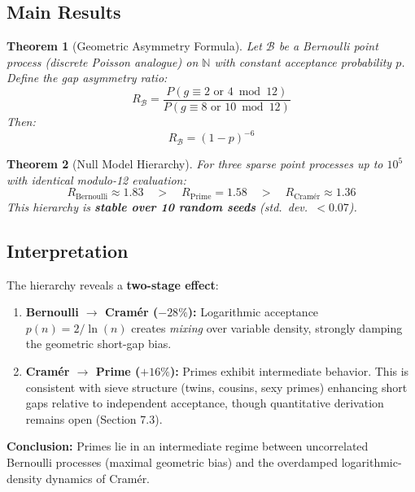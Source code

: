 \documentclass[11pt,a4paper]{article}
\newtheorem{theorem}{Theorem}
\theoremstyle{definition}
\theoremstyle{remark}
\begin{document}
\subsection{Main Results}

\begin{theorem}[Geometric Asymmetry Formula]
Let $\mathcal{B}$ be a Bernoulli point process (discrete Poisson analogue) on $\mathbb{N}$ with constant acceptance probability $p$. Define the gap asymmetry ratio:
\begin{equation}
R_{\mathcal{B}} = \frac{P(g \equiv 2 \text{ or } 4 \bmod 12)}{P(g \equiv 8 \text{ or } 10 \bmod 12)}
\end{equation}
Then:
\begin{equation}\label{eq:main_formula}
\boxed{R_{\mathcal{B}} = (1-p)^{-6}}
\end{equation}
\end{theorem}

\begin{theorem}[Null Model Hierarchy]
For three sparse point processes up to $10^5$ with identical modulo-12 evaluation:
\begin{equation}
R_{\text{Bernoulli}} \approx 1.83 \quad > \quad R_{\text{Prime}} = 1.58 \quad > \quad R_{\text{Cramér}} \approx 1.36
\end{equation}
This hierarchy is \textbf{stable over 10 random seeds} (std.~dev.~$< 0.07$).
\end{theorem}

\subsection{Interpretation}

The hierarchy reveals a \textbf{two-stage effect}:

\begin{enumerate}
\item \textbf{Bernoulli $\to$ Cramér ($-28\%$):} Logarithmic acceptance $p(n) = 2/\ln(n)$ creates \emph{mixing} over variable density, strongly damping the geometric short-gap bias.

\item \textbf{Cramér $\to$ Prime ($+16\%$):} Primes exhibit intermediate behavior. This is consistent with sieve structure (twins, cousins, sexy primes) enhancing short gaps relative to independent acceptance, though quantitative derivation remains open (Section 7.3).
\end{enumerate}

\textbf{Conclusion:} Primes lie in an intermediate regime between uncorrelated Bernoulli processes (maximal geometric bias) and the overdamped logarithmic-density dynamics of Cramér.
\end{document}
